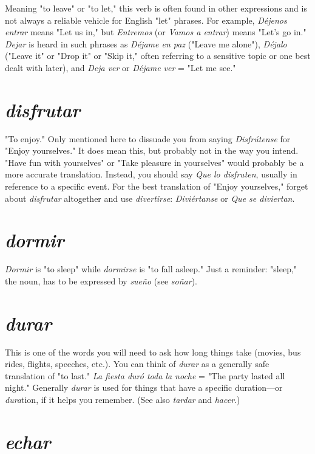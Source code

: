 \documentclass[14pt,a4paper,oneside]{memoir}
\begin{document}
Meaning "to leave" or "to let," this verb is often found in
other expressions and is not always a reliable vehicle for English "let"
phrases. For example, \emph{Déjenos entrar} means "Let us in," but \emph{Entremos}
(or \emph{Vamos a entrar}) means "Let's go in." \emph{Dejar} is heard in such phrases
as \emph{Déjame en paz} ("Leave me alone"), \emph{Déjalo} ("Leave it" or "Drop it"
or "Skip it," often referring to a sensitive topic or one best dealt with
later), and \emph{Deja ver} or \emph{Déjame ver} = "Let me see."

\section{\emph{disfrutar}}

"To enjoy." Only mentioned here to dissuade you from saying
\emph{Disfrútense} for "Enjoy yourselves." It does mean this, but probably not
in the way you intend. "Have fun with yourselves" or "Take pleasure
in yourselves" would probably be a more accurate translation. Instead,
you should say \emph{Que lo disfruten}, usually in reference to a specific
event. For the best translation of "Enjoy yourselves," forget about \emph{disfrutar} altogether and use \emph{divertirse}: \emph{Diviértanse} or \emph{Que se diviertan}.

\section{\emph{dormir}}

\emph{Dormir} is "to sleep" while \emph{dormirse} is "to fall asleep." Just a
reminder: "sleep," the noun, has to be expressed by \emph{sueño} (see \emph{soñar}).

\section{\emph{durar}}

This is one of the words you will need to ask how long things
take (movies, bus rides, flights, speeches, etc.). You can think of \emph{durar}
as a generally safe translation of "to last." \emph{La fiesta duró toda la noche}
= "The party lasted all night." Generally \emph{durar} is used for things that
have a specific duration---or \emph{dura}tion, if it helps you remember. (See
also \emph{tardar} and \emph{hacer}.)

\section{\emph{echar}}
\end{document}
